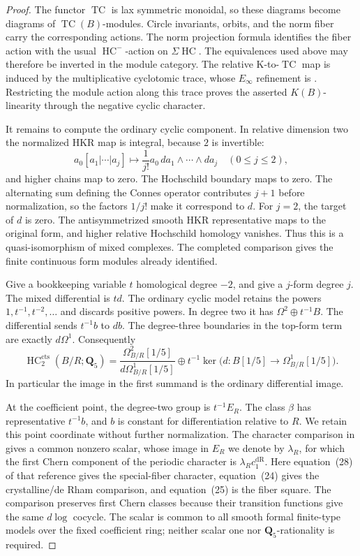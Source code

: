 \documentclass[11pt,a4paper]{amsart}
\numberwithin{equation}{section}
\theoremstyle{definition}
\theoremstyle{remark}
\newcommand{\DtwoQQ}{\mathbf{Q}}
\newcommand{\DtwodR}{\mathrm{dR}}
\newcommand{\Dtwocts}{\mathrm{cts}}
\DeclareMathOperator{\DtwoHC}{HC}
\DeclareMathOperator{\DtwoTC}{TC}
\begin{document}
\begin{proof}
The functor \(\DtwoTC\) is lax symmetric monoidal, so these diagrams
become diagrams of \(\DtwoTC(B)\)-modules.
Circle invariants, orbits, and the norm fiber carry the corresponding
actions. The norm projection formula identifies the fiber action
with the usual \(\DtwoHC^-\)-action on \(\Sigma\DtwoHC\).
The equivalences used above may therefore be inverted in the module
category.
The relative K-to-\(\DtwoTC\) map is induced by the multiplicative
cyclotomic trace, whose \(E_\infty\) refinement is
\cite[Theorem~7.4]{BGTTrace}.
Restricting the module action along this trace proves the asserted
\(K(B)\)-linearity through the negative cyclic character.

It remains to compute the ordinary cyclic component.
In relative dimension two the normalized HKR map is integral,
because \(2\) is invertible:
\[
 a_0[a_1|\cdots|a_j]\longmapsto
 \frac1{j!}a_0\,da_1\wedge\cdots\wedge da_j
 \quad (0\le j\le2),
\]
and higher chains map to zero.
The Hochschild boundary maps to zero.
The alternating sum defining the Connes operator contributes
\(j+1\) before normalization, so the factors \(1/j!\) make it
correspond to \(d\).
For \(j=2\), the target of \(d\) is zero.
The antisymmetrized smooth HKR representative maps to the original
form, and higher relative Hochschild homology vanishes.
Thus this is a quasi-isomorphism of mixed complexes.
The completed comparison gives the finite continuous form modules
already identified.

Give a bookkeeping variable \(t\) homological degree \(-2\), and give
a \(j\)-form degree \(j\).
The mixed differential is \(td\).
The ordinary cyclic model retains the powers
\(1,t^{-1},t^{-2},\ldots\) and discards positive powers.
In degree two it has \(\Omega^2\oplus t^{-1}B\).
The differential sends \(t^{-1}b\) to \(db\).
The degree-three boundaries in the top-form term are exactly
\(d\Omega^1\).
Consequently
\begin{equation}\label{d2:eq:hc-two}
 \DtwoHC_2^\Dtwocts(B/R;\DtwoQQ_5)=
 \frac{\Omega^2_{B/R}[1/5]}{d\Omega^1_{B/R}[1/5]}
 \oplus
 t^{-1}\ker\bigl(d\colon B[1/5]\to\Omega^1_{B/R}[1/5]\bigr).
\end{equation}
In particular the image in the first summand is the ordinary
differential image.

At the coefficient point, the degree-two group is \(t^{-1}E_R\).
The class \(\beta\) has representative \(t^{-1}b\), and \(b\) is
constant for differentiation relative to \(R\).
We retain this point coordinate without further normalization.
The character comparison in
\cite[v2, Constructions~4.7--4.8 and~4.11,
Propositions~4.10 and~4.12, pp.~21--23]{AMMN}
gives a common nonzero scalar, whose image in \(E_R\) we denote
by \(\lambda_R\), for which the first Chern component of the
periodic character is \(\lambda_R c_1^\DtwodR\).
Here equation~(28) of that reference gives the special-fiber
character, equation~(24) gives the crystalline/de Rham comparison,
and equation~(25) is the fiber square.
The comparison preserves first Chern classes because their
transition functions give the same \(d\log\) cocycle.
The scalar is common to all smooth formal finite-type models
over the fixed coefficient ring; neither scalar one nor
\(\DtwoQQ_5\)-rationality is required.


\end{proof}
\end{document}
